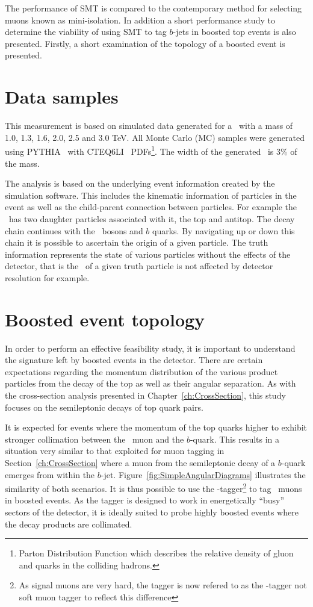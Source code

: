 The performance of SMT is compared to the contemporary method for selecting muons known as mini-isolation. In addition a short performance study to determine the viability of using SMT to tag $b$-jets in boosted top events is also presented. Firstly, a short examination of the topology of a boosted event is presented.

\section{Data samples}

This measurement is based on simulated data generated for a \Zprime\ with a mass of 1.0, 1.3, 1.6, 2.0, 2.5 and 3.0 TeV. All Monte Carlo (MC) samples were generated using PYTHIA~\cite{Pythia} with CTEQ6LI~\cite{Boosted:CTEQ6LI} PDFs\footnote{Parton Distribution Function which describes the relative density of gluon and quarks in the colliding hadrons.}. The width of the generated \Zprime\ is $3\%$ of the mass.

The analysis is based on the underlying event information created by the simulation software. This includes the kinematic information of particles in the event as well as the child-parent connection between particles. For example the \Zprime\ has two daughter particles associated with it, the top and antitop. The decay chain continues with the \W\ bosons and $b$ quarks. By navigating up or down this chain it is possible to ascertain the origin of a given particle. The truth information represents the state of various particles without the effects of the detector, that is the \pt\ of a given truth particle is not affected by detector resolution for example.

\section{Boosted event topology}

In order to perform an effective feasibility study, it is important to understand the signature left by boosted events in the detector. There are certain expectations regarding the momentum distribution of the various product particles from the decay of the top as well as their angular separation. As with the cross-section analysis presented in Chapter~\ref{ch:CrossSection}, this study focuses on the semileptonic decays of top quark pairs.

It is expected for events where the momentum of the top quarks higher to exhibit stronger collimation between the \W\ muon and the $b$-quark. This results in a situation very similar to that exploited for muon tagging in Section~\ref{ch:CrossSection} where a muon from the semileptonic decay of a $b$-quark emerges from within the $b$-jet. Figure~\ref{fig:SimpleAngularDiagrams} illustrates the similarity of both scenarios. It is thus possible to use the \xsm-tagger\footnote{As signal muons are very hard, the tagger is now refered to as the \xsm-tagger not soft muon tagger to reflect this difference} to tag \W\ muons in boosted events. As the tagger is designed to work in energetically ``busy'' sectors of the detector, it is ideally suited to probe highly boosted events where the decay products are collimated.

